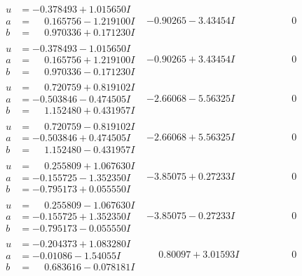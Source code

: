 \documentclass[1p]{elsarticle_modified}
\theoremstyle{definition}
\begin{document}
$$\begin{array}{c|c|c}
\begin{aligned}
u &= -0.378493 + 1.015650 I \\
a &= \phantom{-}0.165756 - 1.219100 I \\
b &= \phantom{-}0.970336 + 0.171230 I\end{aligned}
 & -0.90265 - 3.43454 I & \phantom{-0.000000 } 0 \\ \hline\begin{aligned}
u &= -0.378493 - 1.015650 I \\
a &= \phantom{-}0.165756 + 1.219100 I \\
b &= \phantom{-}0.970336 - 0.171230 I\end{aligned}
 & -0.90265 + 3.43454 I & \phantom{-0.000000 } 0 \\ \hline\begin{aligned}
u &= \phantom{-}0.720759 + 0.819102 I \\
a &= -0.503846 - 0.474505 I \\
b &= \phantom{-}1.152480 + 0.431957 I\end{aligned}
 & -2.66068 - 5.56325 I & \phantom{-0.000000 } 0 \\ \hline\begin{aligned}
u &= \phantom{-}0.720759 - 0.819102 I \\
a &= -0.503846 + 0.474505 I \\
b &= \phantom{-}1.152480 - 0.431957 I\end{aligned}
 & -2.66068 + 5.56325 I & \phantom{-0.000000 } 0 \\ \hline\begin{aligned}
u &= \phantom{-}0.255809 + 1.067630 I \\
a &= -0.155725 - 1.352350 I \\
b &= -0.795173 + 0.055550 I\end{aligned}
 & -3.85075 + 0.27233 I & \phantom{-0.000000 } 0 \\ \hline\begin{aligned}
u &= \phantom{-}0.255809 - 1.067630 I \\
a &= -0.155725 + 1.352350 I \\
b &= -0.795173 - 0.055550 I\end{aligned}
 & -3.85075 - 0.27233 I & \phantom{-0.000000 } 0 \\ \hline\begin{aligned}
u &= -0.204373 + 1.083280 I \\
a &= -0.01086 - 1.54055 I \\
b &= \phantom{-}0.683616 - 0.078181 I\end{aligned}
 & \phantom{-}0.80097 + 3.01593 I & \phantom{-0.000000 } 0 \\ \hline\begin{aligned}

\end{aligned}
\end{array}$$
\end{document}

